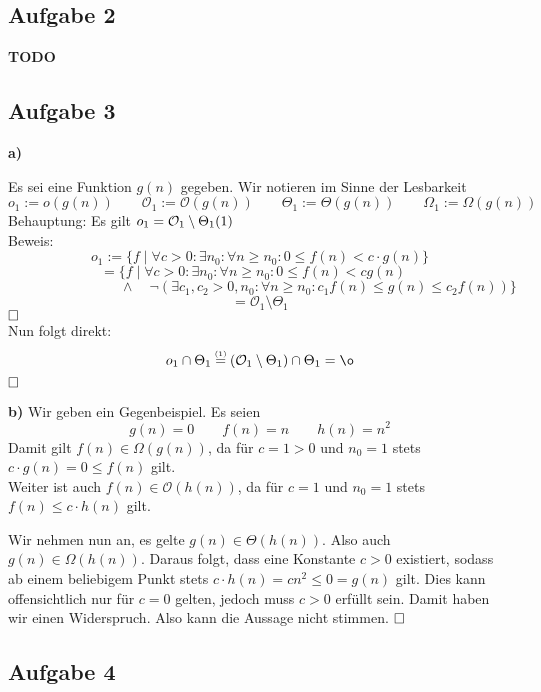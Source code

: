 \documentclass[a4paper,graphics,11pt]{article}
\newcommand{\aufgabe}[1]{\subsection*{Aufgabe #1}}
\newcommand{\up}[2]{\mathrel{\overset{\makebox[0pt]{\mbox{\normalfont\tiny #2}}}{#1}}}
\begin{document}
\aufgabe{2} \textbf{TODO}

\aufgabe{3}
\textbf{a)}

Es sei eine Funktion $g(n)$ gegeben.
Wir notieren im Sinne der Lesbarkeit
$$
	o_1 := o(g(n)) \qquad \mathcal{O}_1 := \mathcal{O}(g(n)) \qquad \Theta_1 := \Theta(g(n)) \qquad \Omega_1 := \Omega(g(n))
$$
Behauptung: Es gilt $o_1 = \mathcal{O}_1 \setminus \Theta_1\hfill(1)$\\
Beweis:
$$
	o_1 := \{f \mid \forall c > 0 : \exists n_0 : \forall n\geq n_0 : 0 \leq f(n) < c\cdot g(n)\}
$$$$
	= \{f \mid \forall c > 0 : \exists n_0 : \forall n\geq n_0 : 0 \leq f(n) < cg(n)\quad
$$$$
	\qquad\qquad\qquad\qquad\land \quad \lnot(\exists c_1,c_2 > 0,n_0 : \forall n\geq n_0 : c_1f(n) \leq g(n) \leq c_2f(n))\}
$$$$
	= \mathcal{O}_1 \setminus \Theta_1
$$
$\hfill\square$\\
Nun folgt direkt:
$$
	o_1 \cap \Theta_1
	\up{=}{(1)} (\mathcal{O}_1 \setminus \Theta_1) \cap \Theta_1 = \o
$$
$\hfill\square$

\textbf{b)}
Wir geben ein Gegenbeispiel.
Es seien
$$
	g(n) = 0 \qquad f(n) = n \qquad h(n) = n^2
$$
Damit gilt $f(n) \in \Omega(g(n))$, da für $c = 1 > 0$ und $n_0 = 1$ stets $c\cdot g(n) = 0 \leq f(n)$ gilt.\\
Weiter ist auch $f(n) \in \mathcal{O}(h(n))$, da für $c = 1$ und $n_0 = 1$ stets $f(n) \leq c\cdot h(n)$ gilt.

Wir nehmen nun an, es gelte $g(n) \in \Theta(h(n))$. Also auch $g(n) \in \Omega(h(n))$. Daraus folgt, dass eine Konstante
$c > 0$ existiert, sodass ab einem beliebigem Punkt stets $c \cdot h(n) = cn^2 \leq 0 = g(n)$ gilt. Dies kann offensichtlich
nur für $c = 0$ gelten, jedoch muss $c > 0$ erfüllt sein. Damit haben wir einen Widerspruch. Also kann die Aussage nicht stimmen.
$\hfill\square$

\newpage
\aufgabe{4}
\end{document}
